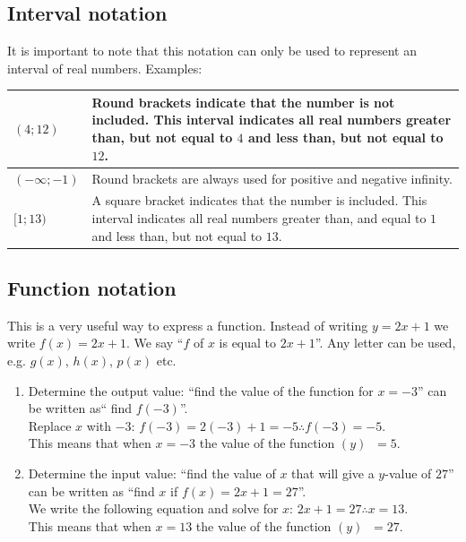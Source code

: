 \subsection*{Interval notation}
It is important to note that this notation can only be used to represent an interval of real numbers.
Examples:
\\
\begin{table}[H]
\begin{tabular}{ |p{5cm} | p{8cm} | }
\hline
  $(4;12)$ &  Round brackets indicate that the number is not included. This interval indicates all real numbers greater than, but not equal to $4$ and less than, but not equal to $12$.
\\ \hline
 $(- \infty; -1)$ & Round brackets are always used for positive and negative infinity. 
\\ \hline
 $[1; 13)$ & A square bracket indicates that the number is included. This interval indicates all real numbers greater than, and equal to $1$ and less than, but not equal to $13$.
\\ \hline
\end{tabular}
\end{table}

\subsection*{Function notation}
This is a very useful way to express a function. Instead of writing $y=2x+1$ we write $f(x) = 2x+1$. We say ``$f$ of $x$ is equal to $2x+1$''. Any letter can be used, e.g. $g(x)$, $h(x)$, $p(x)$ etc. 
\begin{enumerate}[noitemsep, label=\textbf{\arabic*}. ] 
 \item Determine the output value: ``find the value of the function for $x=-3$'' can be written as`` find $f(-3)$''.
\\Replace $x$ with $-3$: $f(-3)=2(-3)+1=-5 \therefore f(-3)=-5$. \\
This means that when $x=-3$ the value of the function $(y)$ $~=5$.
\item Determine the input value: ``find the value of $x$ that will give a $y$-value of $27$'' can be written as ``find $x$ if $f(x)=2x+1 = 27$''. \\
We write the following equation and solve for $x$: $2x+1 = 27 \therefore x=13$.\\
This means that when $x=13$ the value of the function $(y)$ $~=27$.

\end{enumerate}

